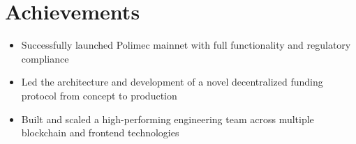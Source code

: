 \documentclass[letterpaper,11pt]{article}
\newcommand{\resumeItem}[1]{
\item\small{
    {#1 \vspace{-2pt}}
  }
}
\newcommand{\resumeSubHeadingListStart}{
\begin{itemize}[leftmargin=0.15in, label={}]}
\newcommand{\resumeSubHeadingListEnd}{
\end{itemize}}
\begin{document}
\section{Achievements}
\resumeSubHeadingListStart
\resumeItem{Successfully launched Polimec mainnet with full functionality and regulatory compliance}
\resumeItem{Led the architecture and development of a novel decentralized funding protocol from concept to production}
\resumeItem{Built and scaled a high-performing engineering team across multiple blockchain and frontend technologies}
\resumeSubHeadingListEnd

\end{document}
